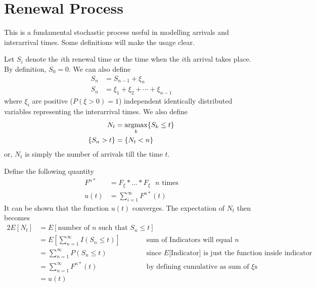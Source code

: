 \documentclass[../probability-notes.tex]{subfiles}
\begin{document}
    \section{Renewal Process}
    This is a fundamental stochastic process useful in modelling arrivals and interarrival times. Some definitions will make the usage clear.\newline

    Let $S_{i}$ denote the $i$th renewal time or the time when the $i$th arrival takes place. By definition, $S_{0} = 0$. We can also define
    \begin{align*}
        S_{n} &= S_{n-1} + \xi_{n}\\
        S_{n} &= \xi_{1} + \xi_{2} + \cdots + \xi_{n-1}
    \end{align*}
    where $\xi_{i}$ are positive ($P(\xi > 0) = 1$) independent identically distributed variables representing the interarrival times. We also define
    \begin{align*}
        N_{t} &= \operatorname*{argmax}_{k} \{ S_{k} \leq t \}\\
        \{ S_{n} > t \} &= \{ N_{t} < n \}
    \end{align*}
    or, $N_{t}$ is simply the number of arrivals till the time $t$.\newline

    Define the following quantity
    \begin{align*}
        F^{n*} &= F_{\xi} * \ldots * F_{\xi} \text{ $n$ times}\\
        u(t) &= \sum_{i=1}^{\infty} F^{n*}(t)
    \end{align*}
    It can be shown that the function $u(t)$ converges. The expectation of $N_{t}$ then becomes
    \begin{alignat*}{2}
        E[N_{t}] &= E[\text{number of $n$ such that $S_{n} \leq t$}]\\
        &= E[\sum_{n=1}^{\infty} I(S_{n} \leq t)] &\text{ sum of Indicators will equal $n$}\\
        &= \sum_{n=1}^{\infty} P(S_{n} \leq t) &\text{ since $E[$Indicator$]$ is just the function inside indicator}\\
        &= \sum_{n=1}^{\infty} F^{n*}(t) &\text{ by defining cumulative as sum of $\xi$s}\\
        &= u(t)
    \end{alignat*}
\end{document}
